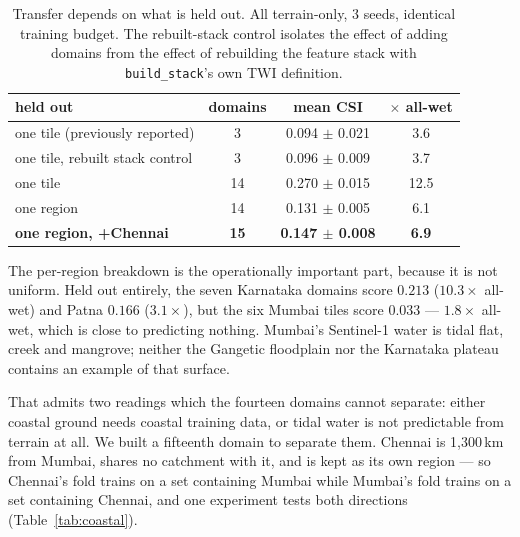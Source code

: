 \documentclass[10pt]{article}
\begin{document}
\begin{table}[t]
\centering\small
\caption{Transfer depends on what is held out. All terrain-only, 3 seeds, identical training
budget. The rebuilt-stack control isolates the effect of adding domains from the effect of
rebuilding the feature stack with \texttt{build\_stack}'s own TWI definition.}
\label{tab:transfer}
\begin{tabular}{lccc}
\toprule
held out & domains & mean CSI & $\times$ all-wet \\
\midrule
one tile (previously reported)  &  3 & 0.094 $\pm$ 0.021 & 3.6 \\
one tile, rebuilt stack control &  3 & 0.096 $\pm$ 0.009 & 3.7 \\
one tile                        & 14 & 0.270 $\pm$ 0.015 & 12.5 \\
one region                      & 14 & 0.131 $\pm$ 0.005 & 6.1 \\
\textbf{one region, +Chennai}    & \textbf{15} & \textbf{0.147 $\pm$ 0.008} & \textbf{6.9} \\
\bottomrule
\end{tabular}
\end{table}

The per-region breakdown is the operationally important part, because it is not uniform. Held out
entirely, the seven Karnataka domains score $0.213$ ($10.3\times$ all-wet) and Patna $0.166$
($3.1\times$), but the six Mumbai tiles score $0.033$ --- $1.8\times$ all-wet, which is close to
predicting nothing. Mumbai's Sentinel-1 water is tidal flat, creek and mangrove; neither the
Gangetic floodplain nor the Karnataka plateau contains an example of that surface.

That admits two readings which the fourteen domains cannot separate: either coastal ground needs
coastal training data, or tidal water is not predictable from terrain at all. We built a
fifteenth domain to separate them. Chennai is 1{,}300\,km from Mumbai, shares no catchment with
it, and is kept as its own region --- so Chennai's fold trains on a set containing Mumbai while
Mumbai's fold trains on a set containing Chennai, and one experiment tests both directions
(Table~\ref{tab:coastal}).
\end{document}
